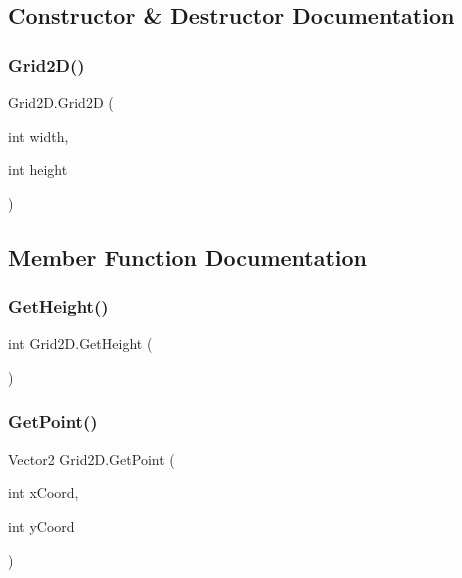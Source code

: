\subsection{Constructor \& Destructor Documentation}
\mbox{\label{struct_grid2_d_a8ab64aa29a75f6612241c1c6ed7d8880}} 
\subsubsection{\texorpdfstring{Grid2\+D()}{Grid2D()}}
{\footnotesize\ttfamily Grid2\+D.\+Grid2D (\begin{DoxyParamCaption}\item[{int}]{width,  }\item[{int}]{height }\end{DoxyParamCaption})}



\subsection{Member Function Documentation}
\mbox{\label{struct_grid2_d_a87d2a1dc516b61b520b05a07d6af5cf7}} 
\subsubsection{\texorpdfstring{Get\+Height()}{GetHeight()}}
{\footnotesize\ttfamily int Grid2\+D.\+Get\+Height (\begin{DoxyParamCaption}{ }\end{DoxyParamCaption})}

\mbox{\label{struct_grid2_d_a080a049e035f44790cb7200518730f6c}} 
\subsubsection{\texorpdfstring{Get\+Point()}{GetPoint()}\hspace{0.1cm}{\footnotesize\ttfamily [1/2]}}
{\footnotesize\ttfamily Vector2 Grid2\+D.\+Get\+Point (\begin{DoxyParamCaption}\item[{int}]{x\+Coord,  }\item[{int}]{y\+Coord }\end{DoxyParamCaption})}

